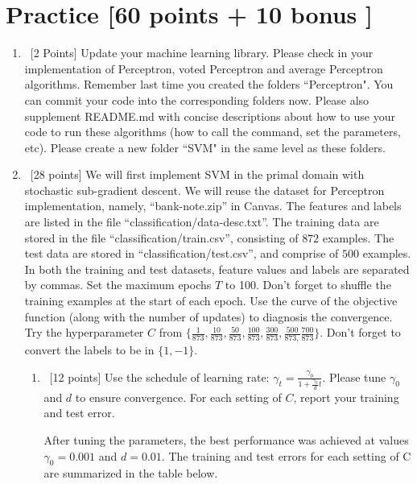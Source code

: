 \documentclass[12pt, fullpage,letterpaper]{article}
\begin{document}
\section{Practice [60 points + 10 bonus ]}
\begin{enumerate}
	\item~[2 Points] Update your machine learning library. Please check in your implementation of Perceptron, voted Perceptron and average Perceptron algorithms. Remember last time you created the folders ``Perceptron". You can commit your code into the corresponding folders now. Please also supplement README.md with concise descriptions about how to use your code to run these algorithms (how to call the command, set the parameters, etc). Please create a new folder ``SVM" in the same level as these folders.  

	\item~[28 points] We will first implement SVM in the primal domain with stochastic sub-gradient descent. We will reuse the  dataset for Perceptron implementation, namely, ``bank-note.zip'' in Canvas. The features and labels are listed in the file ``classification/data-desc.txt''. The training data are stored in the file ``classification/train.csv'', consisting of $872$ examples. The test data are stored in ``classification/test.csv'', and comprise of $500$ examples. In both the training and test datasets, feature values and labels are separated by commas. Set the maximum epochs $T$ to 100. Don't forget to shuffle the training examples at the start of each epoch. Use the curve of the objective function (along with the number of updates) to diagnosis the convergence. Try the hyperparameter $C$ from $\{\frac{1}{873}, \frac{10}{873}, \frac{50}{873}, \frac{100}{873}, \frac{300}{873}, \frac{500}{873,} \frac{700}{873}\}$. Don't forget to convert the labels to be in $\{1, -1\}$.  
	\begin{enumerate}
		\item~[12 points] Use the schedule of learning rate: $\gamma_t = \frac{\gamma_0}{1+\frac{\gamma_0}{d}t}	$. Please tune $\gamma_0$ and $d$ to ensure convergence. For each setting of $C$, report your training and test error. 
		
		After tuning the parameters, the best performance was achieved at values $\gamma_0=0.001$ and $d=0.01$. The training and test errors for each setting of C are summarized in the table below.
		

\end{enumerate}
\end{enumerate}
\end{document}
